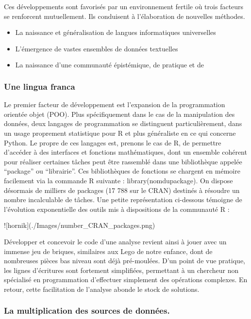 \documentclass[
  letterpaper,
  DIV=11,
  numbers=noendperiod]{scrreprt}
\begin{document}
Ces développements sont favorisés par un environnement fertile où trois
facteurs se renforcent mutuellement. Ils conduisent à l'élaboration de
nouvelles méthodes.

\begin{itemize}
\item
  La naissance et généralisation de langues informatiques universelles
\item
  L'émergence de vastes ensembles de données textuelles
\item
  La naissance d'une communauté épistémique, de pratique et de
\end{itemize}

\subsubsection{Une lingua franca}\label{une-lingua-franca}

Le premier facteur de développement est l'expansion de la programmation
orientée objet (POO). Plus spécifiquement dans le cas de la manipulation
des données, deux langages de programmation se distinguent
particulièrement, dans un usage proprement statistique pour R et plus
généraliste en ce qui concerne Python. Le propre de ces langages est,
prenons le cas de R, de permettre d'accéder à des interfaces et
fonctions mathématiques, dont un ensemble cohérent pour réaliser
certaines tâches peut être rassemblé dans une bibliothèque appelée
``package'' ou ``librairie''. Ces bibliothèques de fonctions se chargent
en mémoire facilement via la commande R suivante :
library(nomdupackage). On dispose désormais de milliers de packages (17
788 sur le CRAN) destinés à résoudre un nombre incalculable de tâches.
Une petite représentation ci-dessous témoigne de l'évolution
exponentielle des outils mis à dispositions de la communauté R :

!{[}hornik{]}(./Images/number\_CRAN\_packages.png)

Développer et concevoir le code d'une analyse revient ainsi à jouer avec
un immense jeu de briques, similaires aux Lego de notre enfance, dont de
nombreuses pièces bas niveau sont déjà pré-moulées. D'un point de vue
pratique, les lignes d'écritures sont fortement simplifiées, permettant
à un chercheur non spécialisé en programmation d'effectuer simplement
des opérations complexes. En retour, cette facilitation de l'analyse
abonde le stock de solutions.

\subsubsection{La multiplication des sources de
données.}\label{la-multiplication-des-sources-de-donnuxe9es.}
\end{document}
